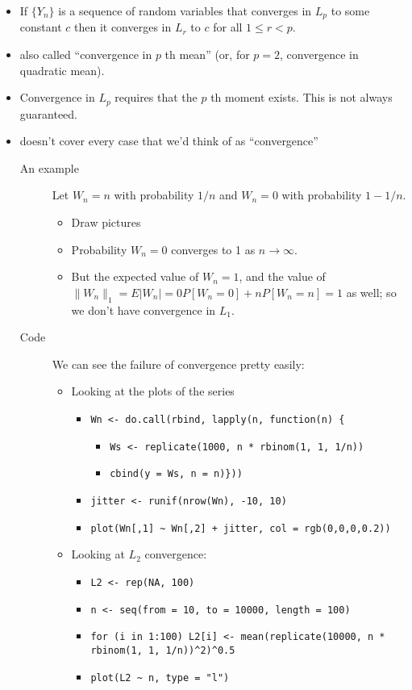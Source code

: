 \documentclass[11pt]{article}
\begin{document}
\begin{itemize}
\item If $\{Y_n\}$ is a sequence of random variables that converges in
        $L_p$ to some constant $c$ then it converges in $L_r$ to $c$ for
        all $1 \leq r < p$.
\item also called ``convergence in $p$ th mean'' (or, for $p = 2$,
        convergence in quadratic mean).
\item Convergence in $L_p$ requires that the $p$ th moment exists.
        This is not always guaranteed.
\item doesn't cover every case that we'd think of as ``convergence''
\begin{description}
\item[An example] Let $W_n = n$ with probability $1/n$ and $W_n = 0$
          with probability $1 - 1/n$.
\begin{itemize}
\item Draw pictures
\item Probability $W_n = 0$ converges to 1 as $n \to \infty$.
\item But the expected value of $W_n = 1$, and the value of $\lVert
            W_n \rVert_1 = E | W_n | = 0 P[W_n = 0] + n P[W_n = n] = 1$
            as well; so we don't have convergence in $L_1$.
\end{itemize}
\item[Code] We can see the failure of convergence pretty easily:
\begin{itemize}
\item Looking at the plots of the series
\begin{itemize}
\item \texttt{Wn <- do.call(rbind, lapply(n, function(n) \{}
\begin{itemize}
\item \texttt{Ws <- replicate(1000, n * rbinom(1, 1, 1/n))}
\item \texttt{cbind(y = Ws, n = n)\}))}
\end{itemize}
\item \texttt{jitter <- runif(nrow(Wn), -10, 10)}
\item \texttt{plot(Wn[,1] \textasciitilde{} Wn[,2] + jitter, col = rgb(0,0,0,0.2))}
\end{itemize}
\item Looking at $L_2$ convergence:
\begin{itemize}
\item \texttt{L2 <- rep(NA, 100)}
\item \texttt{n <- seq(from = 10, to = 10000, length = 100)}
\item \texttt{for (i in 1:100)                  L2[i] <- mean(replicate(10000, n * rbinom(1, 1, 1/n))\textasciicircum{}2)\textasciicircum{}0.5}
\item \texttt{plot(L2 \textasciitilde{} n, type = "l")}
\end{itemize}
\end{itemize}
\end{description}
\end{itemize}
\end{document}

